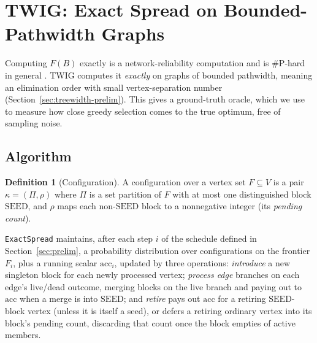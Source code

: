 \documentclass[11pt]{article}
\theoremstyle{definition}
\newtheorem{definition}{Definition}
\theoremstyle{remark}
\newcommand{\FF}{F}
\begin{document}
\section{TWIG: Exact Spread on Bounded-Pathwidth Graphs}\label{sec:twig}

Computing $\FF(B)$ exactly is a network-reliability computation and is \#P-hard in general \citep{valiant1979,provan1983}. TWIG computes it \emph{exactly} on graphs of bounded pathwidth, meaning an elimination order with small vertex-separation number (Section~\ref{sec:treewidth-prelim}). This gives a ground-truth oracle, which we use to measure how close greedy selection comes to the true optimum, free of sampling noise.
\subsection{Algorithm}\label{sec:twig-algo}

\begin{definition}[Configuration]\label{def:config}
A configuration over a vertex set $F\subseteq V$ is a pair
$\kappa=(\Pi,\rho)$ where $\Pi$ is a set partition of $F$ with at most one
distinguished block $\mathrm{SEED}$, and $\rho$ maps each non-$\mathrm{SEED}$
block to a nonnegative integer (its \emph{pending count}).
\end{definition}

\texttt{ExactSpread} maintains, after each step $i$ of the schedule defined
in Section~\ref{sec:prelim}, a probability distribution over configurations
on the frontier $F_i$, plus a running scalar $\mathrm{acc}_i$, updated by
three operations: \emph{introduce} a new singleton block for each newly
processed vertex; \emph{process edge} branches on each edge's live/dead
outcome, merging blocks on the live branch and paying out to $\mathrm{acc}$
when a merge is into $\mathrm{SEED}$; and \emph{retire} pays out $\mathrm{acc}$
for a retiring $\mathrm{SEED}$-block vertex (unless it is itself a seed), or
defers a retiring ordinary vertex into its block's pending count, discarding
that count once the block empties of active members.
\end{document}
